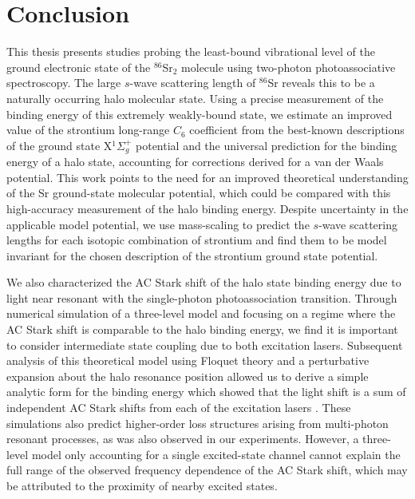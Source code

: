 \chapter{Conclusion} \label{ch:conclusion}
This thesis presents studies probing the least-bound vibrational level of the ground electronic state of the $^{86}$Sr$_2$ molecule using two-photon photoassociative spectroscopy.
The large $s$-wave scattering length of $^{86}$Sr reveals this to be a naturally occurring halo molecular state.
Using a precise measurement of the binding energy of this extremely weakly-bound state, we estimate an improved value of the strontium long-range $C_6$ coefficient from the best-known descriptions of the ground state X$^1\Sigma_g^+$ potential and the universal prediction for the binding energy of a halo state, accounting for corrections derived for a van der Waals potential.
This work points to the need for an improved theoretical understanding of the Sr ground-state molecular potential, which could be compared with this high-accuracy measurement of the halo binding energy.
Despite uncertainty in the applicable model potential, we use mass-scaling to predict the $s$-wave scattering lengths for each isotopic combination of strontium and find them to be model invariant for the chosen description of the strontium ground state potential.

We also characterized the AC Stark shift of the halo state binding energy due to light near resonant with the single-photon photoassociation transition. 
Through numerical simulation of a three-level model and focusing on a regime where the AC Stark shift is comparable to the halo binding energy, we find it is important to consider intermediate state coupling due to both excitation lasers.
Subsequent analysis of this theoretical model using Floquet theory and a perturbative expansion about the halo resonance position allowed us to derive a simple analytic form for the binding energy which showed that the light shift is a sum of independent AC Stark shifts from each of the excitation lasers \cite{Wynar2000,Borkowski2009,Tojo2006}.
These simulations also predict higher-order loss structures arising from multi-photon resonant processes, as was also observed in our experiments.
However, a three-level model only accounting for a single excited-state channel \cite{Bohn1996} cannot explain the full range of the observed frequency dependence of the AC Stark shift, which may be attributed to the proximity of nearby excited states.

